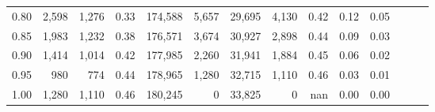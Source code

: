 \begin{tabular}{rrrrrrrrrrrrrr}
0.80 &   2,598 &  1,276 &  0.33 &  174,588 &    5,657 &  29,695 &   4,130 &  0.42 &  0.12 &      0.05 \\
0.85 &   1,983 &  1,232 &  0.38 &  176,571 &    3,674 &  30,927 &   2,898 &  0.44 &  0.09 &      0.03 \\
0.90 &   1,414 &  1,014 &  0.42 &  177,985 &    2,260 &  31,941 &   1,884 &  0.45 &  0.06 &      0.02 \\
0.95 &     980 &    774 &  0.44 &  178,965 &    1,280 &  32,715 &   1,110 &  0.46 &  0.03 &      0.01 \\
1.00 &   1,280 &  1,110 &  0.46 &  180,245 &        0 &  33,825 &       0 &   nan &  0.00 &      0.00 \\
\bottomrule
\end{tabular}
